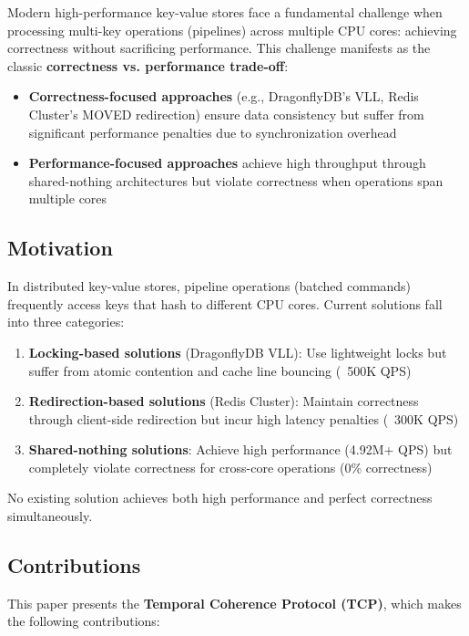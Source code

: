 \documentclass[conference]{IEEEtran}
\begin{document}
Modern high-performance key-value stores face a fundamental challenge when processing multi-key operations (pipelines) across multiple CPU cores: achieving correctness without sacrificing performance. This challenge manifests as the classic \textbf{correctness vs. performance trade-off}:

\begin{itemize}
\item \textbf{Correctness-focused approaches} (e.g., DragonflyDB's VLL, Redis Cluster's MOVED redirection) ensure data consistency but suffer from significant performance penalties due to synchronization overhead
\item \textbf{Performance-focused approaches} achieve high throughput through shared-nothing architectures but violate correctness when operations span multiple cores
\end{itemize}

\subsection{Motivation}

In distributed key-value stores, pipeline operations (batched commands) frequently access keys that hash to different CPU cores. Current solutions fall into three categories:

\begin{enumerate}
\item \textbf{Locking-based solutions} (DragonflyDB VLL): Use lightweight locks but suffer from atomic contention and cache line bouncing (~500K QPS)
\item \textbf{Redirection-based solutions} (Redis Cluster): Maintain correctness through client-side redirection but incur high latency penalties (~300K QPS)
\item \textbf{Shared-nothing solutions}: Achieve high performance (4.92M+ QPS) but completely violate correctness for cross-core operations (0\% correctness)
\end{enumerate}

No existing solution achieves both high performance and perfect correctness simultaneously.

\subsection{Contributions}

This paper presents the \textbf{Temporal Coherence Protocol (TCP)}, which makes the following contributions:
\end{document}

